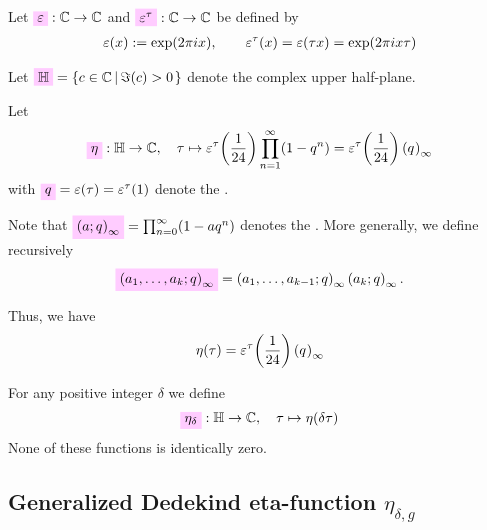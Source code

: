 \documentclass{article}
\begin{document}
\begin{Definition}\label{def:epsilon}
  Let $\defineNotation[epsilon]{\unityPowerSymbol}: \setC \to \setC$
  and $\defineNotation[epsilon-tau]{\unityPowerSymbol^\tau}: \setC \to \setC$
  be defined by
  \begin{gather*}
    \varepsilon\!\left(x\right) := \exp(2\pi i x),
    \qquad
    \varepsilon^\tau\!\left(x\right)=\varepsilon\!\left(\tau x\right) = \exp(2\pi i x \tau)
  \end{gather*}
\end{Definition}

Let $\defineNotation[H]{\setH}=\SetDef{c\in \setC}{\Im(c)>0}$ denote
the complex upper half-plane.

Let
\begin{gather}\label{eq:eta-expansion}
  \defineNotation[eta]{\eta}: \setH \to \setC, \quad
  \tau \mapsto \unityPowerTau{\frac{1}{24}} \prod_{n=1}^{\infty}(1-q^n)
  =
  \unityPowerTau{\frac{1}{24}} \eulerFunction{}
\end{gather}
with $\defineNotation[q]{q} = \unityPower{\tau} = \unityPowerTau{1}$
denote the .

Note that
$\defineNotation[a-q]{\qPochhammer{a}{q}}=\prod_{n=0}^{\infty}(1-aq^n)$
denotes the .
More generally, we define recursively
\begin{gather}
  \defineNotation[a-k-q]{\qPochhammer{a_1,\ldots,a_k}{q}}
  =
  \qPochhammer{a_1,\ldots,a_{k-1}}{q} \qPochhammer{a_k}{q}.
\end{gather}



Thus, we have
\begin{gather*}
  \eta(\tau) = \varepsilon^\tau\!\left(\frac{1}{24}\right) \left({q}^{}\right)_{\infty}
\end{gather*}

For any positive integer $\delta$ we define
\begin{gather}
  \defineNotation[eta-delta]{\eta_\delta}: \setH \to \setC,\quad \tau
  \mapsto \eta(\delta\tau)
  \label{eq:eta_delta(tau)}
\end{gather}
None of these functions is identically zero.





\subsection{Generalized Dedekind eta-function $\eta_{\delta,g}$}
\end{document}
